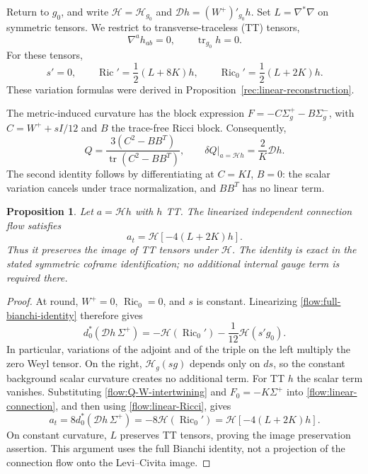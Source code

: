 \documentclass[11pt]{article}
\numberwithin{equation}{section}
\newtheorem{proposition}[theorem]{Proposition}
\theoremstyle{definition}
\theoremstyle{remark}
\DeclareMathOperator{\Ric}{Ric}
\begin{document}
Return to $g_0$, and write $\mathcal H=\mathcal H_{g_0}$ and
$\mathcal D h=(W^+)'_{g_0}h$.  Set $L=\nabla^*\nabla$ on symmetric tensors.
We restrict to transverse-traceless (TT) tensors,
\begin{equation}
 \nabla^ah_{ab}=0,\qquad \operatorname{tr}_{g_0}h=0.
 \label{flow:TT}
\end{equation}
For these tensors,
\begin{equation}
 s'=0,\qquad
 \operatorname{Ric}'=\frac12(L+8K)h,\qquad
 \Ric_0'=\frac12(L+2K)h.
 \label{flow:linear-Ricci}
\end{equation}
These variation formulas were derived in Proposition~\ref{rec:linear-reconstruction}.

The metric-induced curvature has the block expression
$F=-C\Sigma_g^+-B\Sigma_g^-$, with
$C=W^++sI/12$ and $B$ the trace-free Ricci block.  Consequently,
\begin{equation}
 Q=\frac{3(C^2-BB^T)}{\operatorname{tr}(C^2-BB^T)},\qquad
 \left.\delta Q\right|_{a=\mathcal Hh}=\frac2K\mathcal D h.
 \label{flow:Q-W-intertwining}
\end{equation}
The second identity follows by differentiating at $C=KI$, $B=0$:
the scalar variation cancels under trace normalization, and $BB^T$
has no linear term.

\begin{proposition}
\label{flow:ricci-intertwining}
Let $a=\mathcal Hh$ with $h$ TT.  The linearized independent connection
flow satisfies
\begin{equation}
 \boxed{
 a_t=\mathcal H[-4(L+2K)h].
 }
 \label{flow:ricci-intertwining-equation}
\end{equation}
Thus it preserves the image of TT tensors under $\mathcal H$.
The identity is exact in the stated symmetric coframe identification;
no additional internal gauge term is required there.
\end{proposition}

\begin{proof}
At round, $W^+=0$, $\Ric_0=0$, and $s$ is constant.
Linearizing \eqref{flow:full-bianchi-identity} therefore gives
\begin{equation}
 d_0^*(\mathcal D h\,\Sigma^+)
   =-\mathcal H(\Ric_0')
      -\frac1{12}\mathcal H(s'g_0).
 \label{flow:linear-bianchi}
\end{equation}
In particular, variations of the adjoint and of the triple on the left
multiply the zero Weyl tensor.  On the right,
$\mathcal H_g(sg)$ depends only on $ds$, so the constant background
scalar curvature creates no additional term.
For TT $h$ the scalar term vanishes.
Substituting \eqref{flow:Q-W-intertwining} and $F_0=-K\Sigma^+$ into
\eqref{flow:linear-connection}, and then using
\eqref{flow:linear-Ricci}, gives
\begin{equation}
 a_t=8d_0^*(\mathcal D h\,\Sigma^+)
     =-8\mathcal H(\Ric_0')
     =\mathcal H[-4(L+2K)h].
\end{equation}
On constant curvature, $L$ preserves TT tensors, proving the image
preservation assertion.  This argument uses the full Bianchi identity,
not a projection of the connection flow onto the Levi--Civita image.
\end{proof}
\end{document}
